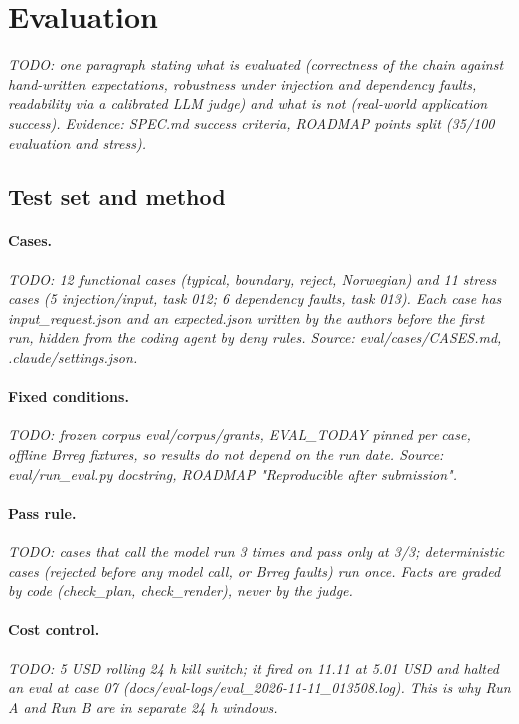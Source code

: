 
\section{Evaluation}
\textit{TODO: one paragraph stating what is evaluated (correctness of the chain against hand-written expectations,
robustness under injection and dependency faults, readability via a calibrated LLM judge) and what is not
(real-world application success). Evidence: SPEC.md success criteria, ROADMAP points split (35/100 evaluation and stress).}

\subsection{Test set and method}
\paragraph{Cases.}
\textit{TODO: 12 functional cases (typical, boundary, reject, Norwegian) and 11 stress cases (5 injection/input, task 012;
6 dependency faults, task 013). Each case has input\_request.json and an expected.json written by the authors before the
first run, hidden from the coding agent by deny rules. Source: eval/cases/CASES.md, .claude/settings.json.}
\paragraph{Fixed conditions.}
\textit{TODO: frozen corpus eval/corpus/grants, EVAL\_TODAY pinned per case, offline Brreg fixtures, so results do not
depend on the run date. Source: eval/run\_eval.py docstring, ROADMAP "Reproducible after submission".}
\paragraph{Pass rule.}
\textit{TODO: cases that call the model run 3 times and pass only at 3/3; deterministic cases (rejected before any model
call, or Brreg faults) run once. Facts are graded by code (check\_plan, check\_render), never by the judge.}
\paragraph{Cost control.}
\textit{TODO: 5 USD rolling 24 h kill switch; it fired on 11.11 at 5.01 USD and halted an eval at case 07
(docs/eval-logs/eval\_2026-11-11\_013508.log). This is why Run A and Run B are in separate 24 h windows.}

